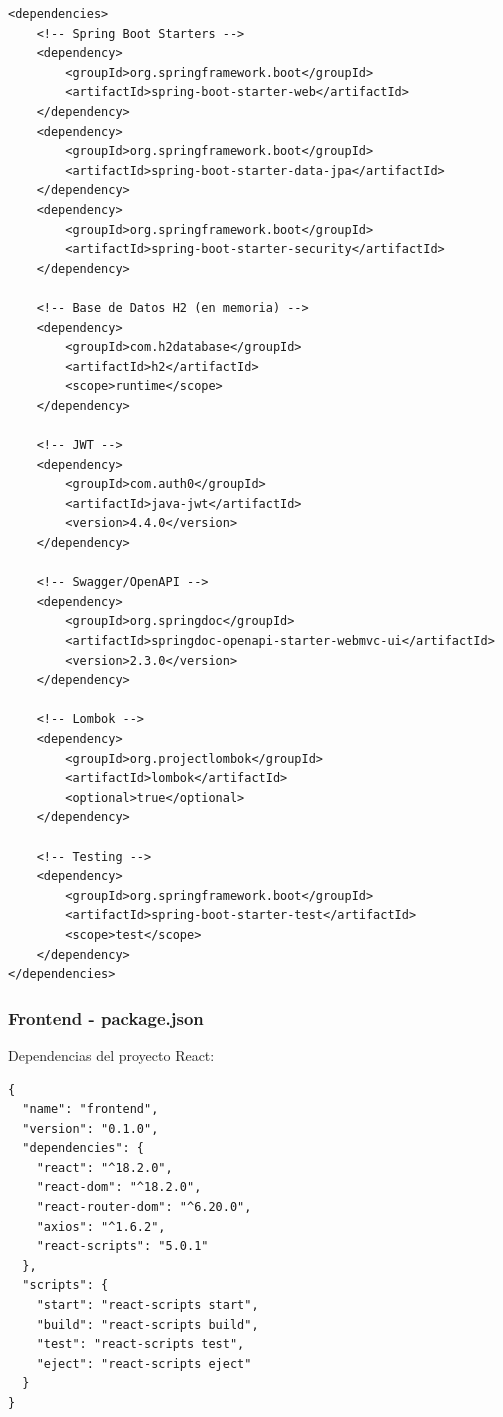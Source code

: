 \documentclass[11pt,a4paper]{article}
\begin{document}
\begin{verbatim}
<dependencies>
    <!-- Spring Boot Starters -->
    <dependency>
        <groupId>org.springframework.boot</groupId>
        <artifactId>spring-boot-starter-web</artifactId>
    </dependency>
    <dependency>
        <groupId>org.springframework.boot</groupId>
        <artifactId>spring-boot-starter-data-jpa</artifactId>
    </dependency>
    <dependency>
        <groupId>org.springframework.boot</groupId>
        <artifactId>spring-boot-starter-security</artifactId>
    </dependency>
    
    <!-- Base de Datos H2 (en memoria) -->
    <dependency>
        <groupId>com.h2database</groupId>
        <artifactId>h2</artifactId>
        <scope>runtime</scope>
    </dependency>
    
    <!-- JWT -->
    <dependency>
        <groupId>com.auth0</groupId>
        <artifactId>java-jwt</artifactId>
        <version>4.4.0</version>
    </dependency>
    
    <!-- Swagger/OpenAPI -->
    <dependency>
        <groupId>org.springdoc</groupId>
        <artifactId>springdoc-openapi-starter-webmvc-ui</artifactId>
        <version>2.3.0</version>
    </dependency>
    
    <!-- Lombok -->
    <dependency>
        <groupId>org.projectlombok</groupId>
        <artifactId>lombok</artifactId>
        <optional>true</optional>
    </dependency>
    
    <!-- Testing -->
    <dependency>
        <groupId>org.springframework.boot</groupId>
        <artifactId>spring-boot-starter-test</artifactId>
        <scope>test</scope>
    </dependency>
</dependencies>
\end{verbatim}

\subsubsection{Frontend - package.json}

Dependencias del proyecto React:

\begin{verbatim}
{
  "name": "frontend",
  "version": "0.1.0",
  "dependencies": {
    "react": "^18.2.0",
    "react-dom": "^18.2.0",
    "react-router-dom": "^6.20.0",
    "axios": "^1.6.2",
    "react-scripts": "5.0.1"
  },
  "scripts": {
    "start": "react-scripts start",
    "build": "react-scripts build",
    "test": "react-scripts test",
    "eject": "react-scripts eject"
  }
}
\end{verbatim}
\end{document}
